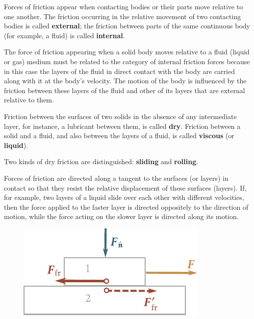 Forces of friction appear when contacting bodies or their parts move relative to one another. The friction occurring in the relative movement of two contacting bodies is called \textbf{external}; the friction between parts of the same continuous body (for example, a fluid) is called \textbf{internal}.

The force of friction appearing when a solid body moves relative to a fluid (liquid or gas) medium must be related to the category of internal friction forces because in this case the layers of the fluid in direct contact with the body are carried along with it at the body's velocity. The motion of the body is influenced by the friction between these layers of the fluid and other of its layers that are external relative to them.

Friction between the surfaces of two solids in the absence of any intermediate layer, for instance, a lubricant between them, is called \textbf{dry}. Friction between a solid and a fluid, and also between the layers of a fluid, is called \textbf{viscous} (or \textbf{liquid}).

Two kinds of dry friction are distinguished: \textbf{sliding} and \textbf{rolling}.

Forces of friction are directed along a tangent to the surfaces (or layers) in contact so that they resist the relative displacement of these surfaces (layers). If, for example, two layers of a liquid slide over each other with different velocities, then the force applied to the faster layer is directed oppositely to the direction of motion, while the force acting on the slower layer is directed along its motion.

\begin{figure}[t]
	\begin{center}
		\includegraphics[scale=1]{figures/ch_02/fig_2_8.pdf}
		\caption[]{}
		\label{fig:2_8}
	\end{center}
	\vspace{-0.7cm}
\end{figure}

